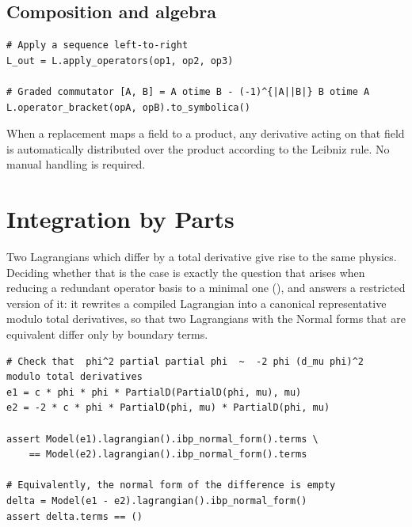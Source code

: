 \subsection*{Composition and algebra}

\begin{verbatim}
# Apply a sequence left-to-right
L_out = L.apply_operators(op1, op2, op3)

# Graded commutator [A, B] = A otime B - (-1)^{|A||B|} B otime A
L.operator_bracket(opA, opB).to_symbolica()
\end{verbatim}

\begin{tcolorbox}[infobox, title={Derivative distribution}]
When a replacement maps a field to a product, any derivative acting on that
field is automatically distributed over the product according to the Leibniz
rule. No manual handling is required.
\end{tcolorbox}

\section{Integration by Parts}
\label{sec:feynpy-ibp}

Two Lagrangians which differ by a total derivative give rise to the same physics.
Deciding whether that is the case is exactly the question that arises when
reducing a redundant operator basis to a minimal one
(), and  answers a
restricted version of it: it rewrites a compiled Lagrangian into a canonical
representative modulo total derivatives, so that two Lagrangians with the
Normal forms that are equivalent differ only by boundary terms.

\begin{verbatim}
# Check that  phi^2 partial partial phi  ~  -2 phi (d_mu phi)^2  modulo total derivatives
e1 = c * phi * phi * PartialD(PartialD(phi, mu), mu)
e2 = -2 * c * phi * PartialD(phi, mu) * PartialD(phi, mu)

assert Model(e1).lagrangian().ibp_normal_form().terms \
    == Model(e2).lagrangian().ibp_normal_form().terms

# Equivalently, the normal form of the difference is empty
delta = Model(e1 - e2).lagrangian().ibp_normal_form()
assert delta.terms == ()
\end{verbatim}

